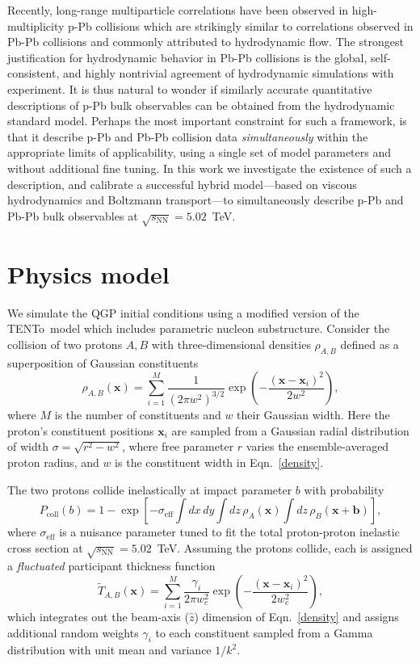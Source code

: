 \documentclass[3p,times,procedia,sort&compress]{elsarticle}
\newcommand{\trento}{T\raisebox{-0.3ex}{R}ENTo}
\newcommand{\sqrts}{\sqrt{s_\mathrm{NN}}}
\newcommand{\T}{\tilde{T}}
\begin{document}
Recently, long-range multiparticle correlations have been observed in high-multiplicity p-Pb collisions which are strikingly similar to correlations observed in Pb-Pb collisions and commonly attributed to hydrodynamic flow.
The strongest justification for hydrodynamic behavior in Pb-Pb collisions is the global, self-consistent, and highly nontrivial agreement of hydrodynamic simulations with experiment.
It is thus natural to wonder if similarly accurate quantitative descriptions of p-Pb bulk observables can be obtained from the hydrodynamic standard model.
Perhaps the most important constraint for such a framework, is that it describe p-Pb and Pb-Pb collision data \emph{simultaneously} within the appropriate limits of applicability, using a single set of model parameters and without additional fine tuning.
In this work we investigate the existence of such a description, and calibrate a successful hybrid model---based on viscous hydrodynamics and Boltzmann transport---to simultaneously describe p-Pb and Pb-Pb bulk observables at $\sqrts=5.02$~TeV.

\section{Physics model}

We simulate the QGP initial conditions using a modified version of the \trento\ model \cite{Moreland:2014oya} which includes parametric nucleon substructure.
Consider the collision of two protons $A, B$ with three-dimensional densities $\rho_{A,B}$ defined as a superposition of Gaussian constituents
\begin{equation}
  \label{density}
  \rho_{A,B}(\textbf{x}) = \sum\limits_{i=1}^{M} \frac{1}{(2 \pi w^2)^{3/2}} \exp\left(-\frac{(\textbf{x}-\textbf{x}_i)^2}{2 w^2}\right),
\end{equation}
where $M$ is the number of constituents and $w$ their Gaussian width.
Here the proton's constituent positions $\textbf{x}_i$ are sampled from a Gaussian radial distribution of width $\sigma = \sqrt{r^2 - w^2}$, where free parameter $r$ varies the ensemble-averaged proton radius, and $w$ is the constituent width in Eqn.~\eqref{density}.

The two protons collide inelastically at impact parameter $b$ with probability
\begin{equation}
  \label{pcoll}
  P_\text{coll}(b) = 1 - \exp\left[-\sigma_\text{eff} \int dx\,dy \int dz\, \rho_A(\mathbf{x}) \int dz\, \rho_B(\mathbf{x} + \mathbf{b}) \right],
\end{equation}
where $\sigma_\text{eff}$ is a nuisance parameter tuned to fit the total proton-proton inelastic cross section at \mbox{$\sqrts=5.02$~TeV}.
Assuming the protons collide, each is assigned a \emph{fluctuated} participant thickness function
\begin{equation}
  \label{part}
  \T_{A,B}(\mathbf{x}) = \sum\limits_{i=1}^{M} \frac{\gamma_i}{2 \pi w_c^2} \exp\left(-\frac{(\textbf{x}-\textbf{x}_i)^2}{2 w_c^2}\right),
\end{equation}
which integrates out the beam-axis ($\hat{z}$) dimension of Eqn.~\eqref{density} and assigns additional random weights $\gamma_i$ to each constituent sampled from a Gamma distribution with unit mean and variance $1/k^2$.
\end{document}

